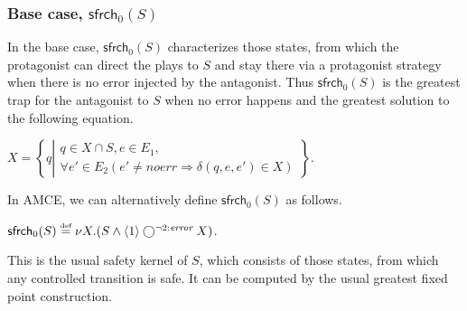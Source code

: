 \documentclass[times,10pt,twocolumn]{article}
\newcommand\safe{\mathsf{sfrch}}
\newcommand{\emnerr}{\textit{noerr}}
\newcommand{\emserr}{\textit{\scriptsize error}}
\newcommand{\defn}{\stackrel{\mbox{\tiny def}}{=}}
\newcommand{\nxt}{\bigcirc}
\begin{document}
\subsubsection{Base case, $\safe_0(S)$} 

In the base case, 
$\safe_0(S)$ characterizes those states, from which the protagonist 
can direct the plays to 
$S$\label{reply2.those.states.that.can.goto.S}   
 and 
stay there via a protagonist strategy when there is no error injected by 
the antagonist. 
Thus $\safe_0(S)$ is the greatest trap for the antagonist to $S$ when no error happens and 
the greatest solution to the following equation. 
\begin{center} 
\label{reply2.SPrime}
$X=\left\{q \left| \begin{array}{l}
	q\in X\cap S, e\in E_1, \\
	\forall e'\in E_2(e' \neq \emnerr\Rightarrow \delta(q,e,e') \in X) 
	\end{array}\right.\right\}$. 
\end{center} 
In AMCE, we can alternatively define $\safe_0(S)$ as follows. 
\begin{center} 
\label{reply2.smallX}
$\safe_0(S)\defn \nu X.(S\wedge\langle 1\rangle \nxt^{\neg 2:\emserr} X)$.  
\end{center} 
This is the usual safety kernel of $S$, which consists of those states, from 
which any controlled transition is safe.  
It can be computed by the usual greatest fixed point construction.
\end{document}
